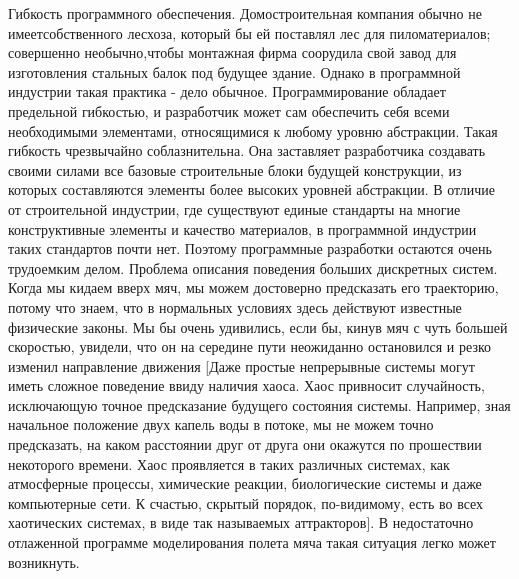 \documentclass[10pt]{article}
\begin{document}
Гибкость программного обеспечения. Домостроительная компания обычно не имеет\linebreak  собственного лесхоза, который бы ей поставлял лес для пиломатериалов; совершенно необычно,\linebreak  чтобы монтажная фирма соорудила свой завод для изготовления стальных балок под будущее здание. Однако в программной индустрии такая практика - дело обычное. Программирование обладает предельной гибкостью, и разработчик может сам обеспечить себя всеми необходимыми элементами, относящимися к любому уровню абстракции. Такая гибкость чрезвычайно соблазнительна. Она заставляет разработчика создавать своими силами все базовые строительные блоки будущей конструкции, из которых составляются элементы более высоких уровней абстракции. В отличие от строительной индустрии, где существуют единые стандарты на многие конструктивные элементы и качество материалов, в программной индустрии таких стандартов почти нет. Поэтому программные разработки остаются очень трудоемким делом. 
Проблема описания поведения больших дискретных систем. Когда мы кидаем вверх мяч, мы можем достоверно предсказать его траекторию, потому что знаем, что в нормальных условиях здесь действуют известные физические законы. Мы бы очень удивились, если бы, кинув мяч с чуть большей скоростью, увидели, что он на середине пути неожиданно остановился и резко изменил направление движения [Даже простые непрерывные системы могут иметь сложное поведение ввиду наличия хаоса. Хаос привносит случайность, исключающую точное предсказание будущего состояния системы. Например, зная начальное положение двух капель воды в потоке, мы не можем точно предсказать, на каком расстоянии друг от друга они окажутся по прошествии некоторого времени. Хаос проявляется в таких различных системах, как атмосферные процессы, химические реакции, биологические системы и даже компьютерные сети. К счастью, скрытый порядок, по-видимому, есть во всех хаотических системах, в виде так называемых аттракторов]. В недостаточно отлаженной программе моделирования полета мяча такая ситуация легко может возникнуть. 
\end{document}
